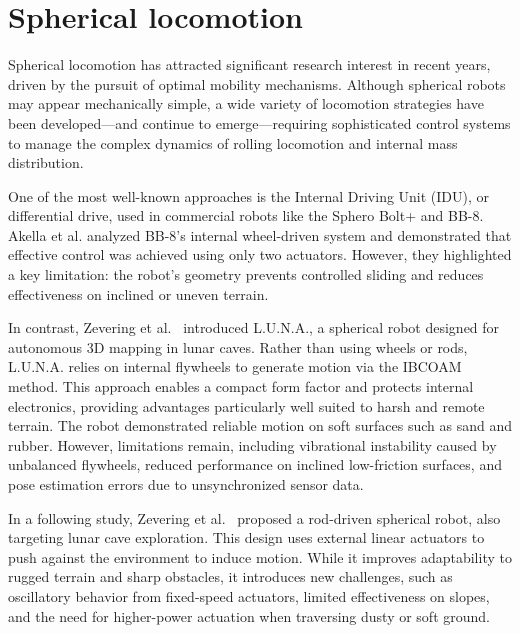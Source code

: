 \documentclass[english, bachelor, utf8]{base/thesis_telematics}
\begin{document}
\section{Spherical locomotion}\label{sec:state-of-the-art}
Spherical locomotion has attracted significant research interest in recent years, driven by the pursuit of optimal mobility mechanisms. 
Although spherical robots may appear mechanically simple, a wide variety of locomotion strategies have been developed—and continue to emerge—requiring sophisticated control systems to manage the complex dynamics of rolling locomotion and internal mass distribution.

One of the most well-known approaches is the Internal Driving Unit (IDU), or differential drive, used in commercial robots like the Sphero Bolt+ and BB-8. 
Akella et al.\cite{Sphero} analyzed BB-8’s internal wheel-driven system and demonstrated that effective control was achieved using only two actuators. 
However, they highlighted a key limitation: the robot’s geometry prevents controlled sliding and reduces effectiveness on inclined or uneven terrain.

In contrast, Zevering et al.~\cite{luna} introduced L.U.N.A., a spherical robot designed for autonomous 3D mapping in lunar caves. 
Rather than using wheels or rods, L.U.N.A. relies on internal flywheels to generate motion via the IBCOAM method. 
This approach enables a compact form factor and protects internal electronics, providing advantages particularly well suited to harsh and remote terrain. 
The robot demonstrated reliable motion on soft surfaces such as sand and rubber. 
However, limitations remain, including vibrational instability caused by unbalanced flywheels, reduced performance on inclined low-friction surfaces, and pose estimation errors due to unsynchronized sensor data.

In a following study, Zevering et al.~\cite{rod_sphere} proposed a rod-driven spherical robot, also targeting lunar cave exploration. 
This design uses external linear actuators to push against the environment to induce motion. 
While it improves adaptability to rugged terrain and sharp obstacles, it introduces new challenges, such as oscillatory behavior from fixed-speed actuators, limited effectiveness on slopes, and the need for higher-power actuation when traversing dusty or soft ground.
\end{document}
